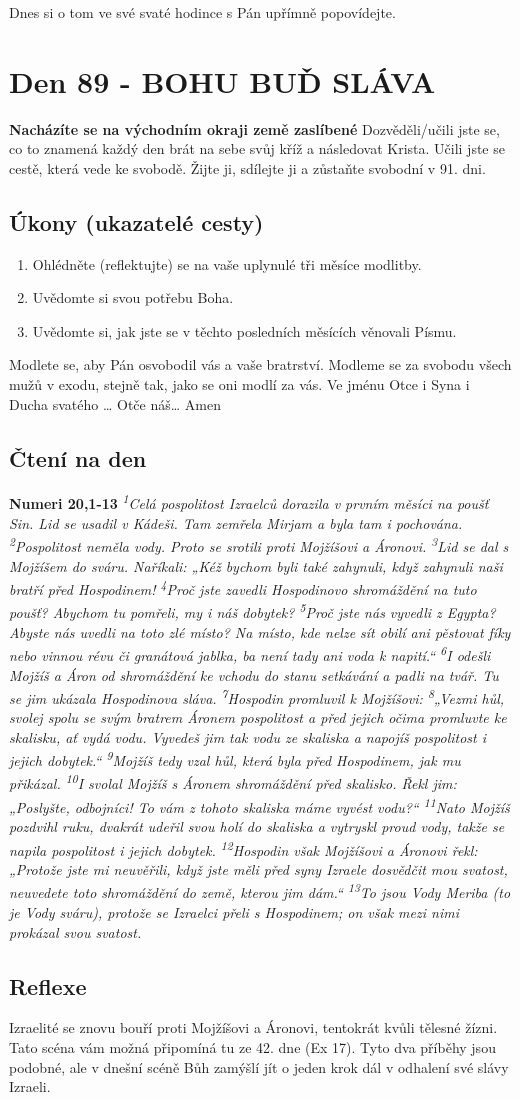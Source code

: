\documentclass[11pt]{article}
\newcommand{\zacatekTrinactyTyden}{
\textbf{Nacházíte se na východním okraji země zaslíbené} \newline 
Dozvěděli/učili jste se, co to znamená každý den brát na sebe svůj kříž a následovat Krista. Učili jste se cestě, která vede ke svobodě. Žijte ji, sdílejte ji a zůstaňte svobodní v 91. dni.

\subsection*{Úkony (ukazatelé cesty)}
\begin{enumerate}
  \item Ohlédněte (reflektujte) se na vaše uplynulé tři měsíce modlitby.
  \item Uvědomte si svou potřebu Boha.
  \item Uvědomte si, jak jste se v těchto posledních měsících věnovali Písmu.
\end{enumerate}
Modlete se, aby Pán osvobodil vás a vaše bratrství. \newline
Modleme se za svobodu všech mužů v exodu, stejně tak, jako se oni modlí za vás.\newline
Ve jménu Otce i Syna i Ducha svatého …  Otče náš… Amen
}
\begin{document}
Dnes si o tom ve své svaté hodince s Pán upřímně popovídejte.


\newpage
\section{Den 89 - BOHU BUĎ SLÁVA}
\zacatekTrinactyTyden
\subsection*{Čtení na den}
\textbf{Numeri 20,1-13}
\newline
\textit{
\textsuperscript{1}Celá pospolitost Izraelců dorazila v prvním měsíci na poušť Sin. Lid se usadil v Kádeši. Tam zemřela Mirjam a byla tam i pochována.
\textsuperscript{2}Pospolitost neměla vody. Proto se srotili proti Mojžíšovi a Áronovi.
\textsuperscript{3}Lid se dal s Mojžíšem do sváru. Naříkali: „Kéž bychom byli také zahynuli, když zahynuli naši bratří před Hospodinem!
\textsuperscript{4}Proč jste zavedli Hospodinovo shromáždění na tuto poušť? Abychom tu pomřeli, my i náš dobytek?
\textsuperscript{5}Proč jste nás vyvedli z Egypta? Abyste nás uvedli na toto zlé místo? Na místo, kde nelze sít obilí ani pěstovat fíky nebo vinnou révu či granátová jablka, ba není tady ani voda k napití.“
\textsuperscript{6}I odešli Mojžíš a Áron od shromáždění ke vchodu do stanu setkávání a padli na tvář. Tu se jim ukázala Hospodinova sláva.
\textsuperscript{7}Hospodin promluvil k Mojžíšovi:
\textsuperscript{8}„Vezmi hůl, svolej spolu se svým bratrem Áronem pospolitost a před jejich očima promluvte ke skalisku, ať vydá vodu. Vyvedeš jim tak vodu ze skaliska a napojíš pospolitost i jejich dobytek.“
\textsuperscript{9}Mojžíš tedy vzal hůl, která byla před Hospodinem, jak mu přikázal.
\textsuperscript{10}I svolal Mojžíš s Áronem shromáždění před skalisko. Řekl jim: „Poslyšte, odbojníci! To vám z tohoto skaliska máme vyvést vodu?“
\textsuperscript{11}Nato Mojžíš pozdvihl ruku, dvakrát udeřil svou holí do skaliska a vytryskl proud vody, takže se napila pospolitost i jejich dobytek.
\textsuperscript{12}Hospodin však Mojžíšovi a Áronovi řekl: „Protože jste mi neuvěřili, když jste měli před syny Izraele dosvědčit mou svatost, neuvedete toto shromáždění do země, kterou jim dám.“
\textsuperscript{13}To jsou Vody Meriba (to je Vody sváru), protože se Izraelci přeli s Hospodinem; on však mezi nimi prokázal svou svatost.
}

\subsection*{Reflexe}
Izraelité se znovu bouří proti Mojžíšovi a Áronovi, tentokrát kvůli tělesné žízni. Tato scéna vám možná připomíná tu
ze 42. dne (Ex 17). Tyto dva příběhy jsou podobné, ale v dnešní scéně Bůh zamýšlí jít o jeden krok dál v odhalení své
slávy Izraeli.
\end{document}
